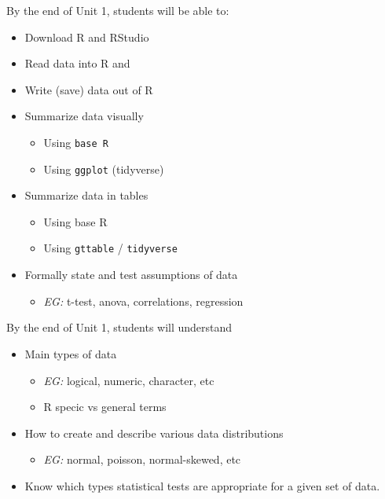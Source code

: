 \documentclass[
]{book}
\providecommand{\tightlist}{%
  \setlength{\itemsep}{0pt}\setlength{\parskip}{0pt}}
\begin{document}
By the end of Unit 1, students will be able to:

\begin{itemize}
\tightlist
\item
  Download R and RStudio
\item
  Read data into R and
\item
  Write (save) data out of R
\item
  Summarize data visually

  \begin{itemize}
  \tightlist
  \item
    Using \texttt{base\ R}
  \item
    Using \texttt{ggplot} (tidyverse)
  \end{itemize}
\item
  Summarize data in tables

  \begin{itemize}
  \tightlist
  \item
    Using base R
  \item
    Using \texttt{gttable} / \texttt{tidyverse}
  \end{itemize}
\item
  Formally state and test assumptions of data

  \begin{itemize}
  \tightlist
  \item
    \emph{EG:} t-test, anova, correlations, regression
  \end{itemize}
\end{itemize}

By the end of Unit 1, students will understand

\begin{itemize}
\tightlist
\item
  Main types of data

  \begin{itemize}
  \tightlist
  \item
    \emph{EG:} logical, numeric, character, etc
  \item
    R specic vs general terms
  \end{itemize}
\item
  How to create and describe various data distributions

  \begin{itemize}
  \tightlist
  \item
    \emph{EG:} normal, poisson, normal-skewed, etc
  \end{itemize}
\item
  Know which types statistical tests are appropriate for a given set of data.
\end{itemize}
\end{document}
